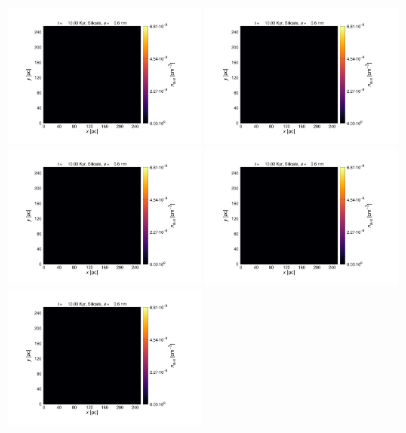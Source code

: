 \documentclass[fleqn,usenatbib]{mnras}
\begin{document}
     \begin{figure}
   \includegraphics[trim=2.8cm 1.5cm 9.3cm 2.0cm, clip=true,page=1,height = 3.6cm]{Pics/Pics_A2/Density_1_00041.pdf}\hspace*{-0.05cm}
   \includegraphics[trim=2.8cm 1.5cm 9.3cm 2.0cm, clip=true,page=2,height = 3.6cm]{Pics/Pics_A2/Density_1_00041.pdf}\hspace*{-0.05cm}
   \includegraphics[trim=2.8cm 1.5cm 9.3cm 2.0cm, clip=true,page=3,height = 3.6cm]{Pics/Pics_A2/Density_1_00041.pdf}\hspace*{-0.05cm}
   \includegraphics[trim=5.2cm 1.5cm 3.2cm 2.0cm, clip=true,page=4,height = 3.6cm]{Pics/Pics_A2/Density_1_00041.pdf}\hspace*{-0.05cm}
   \includegraphics[trim=2.8cm 1.5cm 9.3cm 2.0cm, clip=true,page=4,height = 3.6cm]{Pics/Pics_A2/Density_1_00041.pdf}\\

\end{figure}
\end{document}
